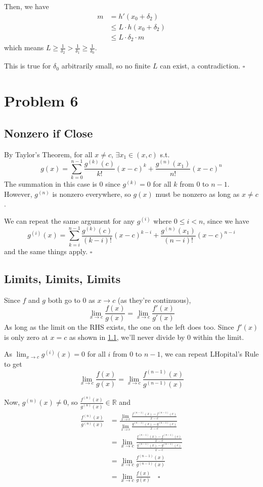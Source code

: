 \documentclass[12pt]{article}
\newcommand{\R}{\mathbb{R}}
\begin{document}
Then, we have
\begin{align*}
  m & = h'(x_0+\delta_2)            \\
    & \le L \cdot h(x_0 + \delta_2) \\
    & \le L \cdot \delta_2 \cdot m
\end{align*}
which means $L \ge \frac{1}{\delta_2} > \frac{1}{\delta_1} \ge \frac{1}{\delta_0}$.

This is true for $\delta_0$ arbitrarily small, so no finite $L$ can exist, a contradiction. $\square$

\pagebreak

\section{Problem 6}

\subsection{Nonzero if Close}\label{sec:p6p1}

By Taylor's Theorem, for all $x \ne c$, $\exists x_1 \in (x, c)$ s.t.
\[g(x)=\sum_{k=0}^{n-1} \frac{g^{(k)}(c)}{k!}(x-c)^k + \frac{g^{(n)}(x_1)}{n!}(x-c)^n\]
The summation in this case is $0$ since $g^{(k)}=0$ for all $k$ from $0$ to $n-1$.
However, $g^{(n)}$ is nonzero everywhere, so $g(x)$ must be nonzero as long as $x \ne c$.

We can repeat the same argument for any $g^{(i)}$ where $0 \le i < n$, since we have
\[g^{(i)}(x)=\sum_{k=i}^{n-1} \frac{g^{(k)}(c)}{(k-i)!}(x-c)^{k-i} + \frac{g^{(n)}(x_1)}{(n-i)!}(x-c)^{n-i}\]
and the same things apply. $\square$

\subsection{Limits, Limits, Limits}

Since $f$ and $g$ both go to $0$ as $x \to c$ (as they're continuous),
\[\lim_{x \to c} \frac{f(x)}{g(x)}=\lim_{x \to c} \frac{f'(x)}{g'(x)}\]
As long as the limit on the RHS exists, the one on the left does too.
Since $f'(x)$ is only zero at $x=c$ as shown in \ref{sec:p6p1},
we'll never divide by $0$ within the limit.

As $\lim_{x \to c} g^{(i)}(x)=0$ for all $i$ from $0$ to $n-1$,
we can repeat LHopital's Rule to get
\[\lim_{x \to c} \frac{f(x)}{g(x)}
  =\lim_{x \to c} \frac{f^{(n-1)}(x)}{g^{(n-1)}(x)}\]

Now, $g^{(n)}(x) \ne 0$, so $\frac{f^{(n)}(x)}{g^{(n)}(x)} \in \R$ and
\begin{align*}
  \frac{f^{(n)}(x)}{g^{(n)}(x)}
  &= \frac{\lim_{x \to c} \frac{f^{(n-1)}(x)-f^{(n-1)}(c)}{x-c}}{\lim_{x \to c} \frac{g^{(n-1)}(x)-g^{(n-1)}(c)}{x-c}} \\
  &= \lim_{x \to c} \frac{\frac{f^{(n-1)}(x)-f^{(n-1)}(c)}{x-c}}{\frac{g^{(n-1)}(x)-g^{(n-1)}(c)}{x-c}} \\
  &= \lim_{x \to c} \frac{f^{(n-1)}(x)}{g^{(n-1)}(x)} \\
  &= \lim_{x \to c} \frac{f(x)}{g(x)}\quad\square
\end{align*}
\end{document}
